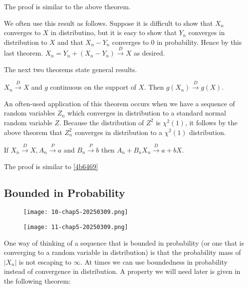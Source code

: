 The proof is similar to the above theorem.

We often use this result as follows. Suppose it is difficult to show that $X_n$ converges to $X$ in distributino, but it is easy to show that $Y_n$ converges in distribution to $X$ and that $X_n-Y_n$ converges to 0 in probability. Hence by this last theorem. $X_n=Y_n+(X_n-Y_n)\overset{ D }{ \to }X$ as desired.

The next two theorems state general results.

\begin{theorem}
$X_n\overset{ D }{ \to }X$ and $g$ continuous on the support of $X$. Then $g(X_n)\overset{ D }{ \to }g(X)$.\label{721da5}
\end{theorem}

An often-used application of this theorem occurs when we have a sequence of random variables $Z_n$ which converges in distribution to a standard normal random variable $Z$. Because the distribution of $Z^{2}$ is $\chi^{2}(1)$, it follows by the above theorem that $Z_n^{2}$ converges in distribution to a $\chi^{2}(1)$ distribution.

\begin{theorem}
If $X_n\overset{ D }{ \to }X,A_n\overset{ P }{ \to }a$ and $B_n\overset{ P }{ \to }b$ then $A_n+B_nX_n\overset{ D }{ \to }a+bX$.\label{1136a4}
\end{theorem}

The proof is similar to \cref{4b6469}

\subsection{Bounded in Probability}

\begin{figure}[H]
\centering
\texttt{[image: 10-chap5-20250309.png]}
\label{}
\end{figure}

\begin{theorem}
\begin{figure}[H]
\centering
\texttt{[image: 11-chap5-20250309.png]}
\label{}
\end{figure}\label{b809d0}
\end{theorem}

One way of thinking of a sequence that is bounded in probability (or one that is converging to a random variable in distribution) is that the probability mass of $\lvert X_n \rvert$ is not escaping to $\infty$. At times we can use boundedness in probability instead of convergence in distribution. A property we will need  later is given in the following theorem:

